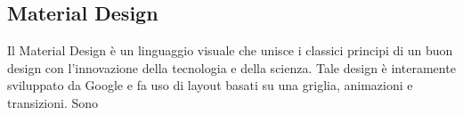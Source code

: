 	\subsection{Material Design}
	Il Material Design è un linguaggio visuale che unisce i classici principi di
	un buon design con l'innovazione della tecnologia e della scienza. 
	\cite{material} \newline
	Tale design è interamente sviluppato da Google e fa uso di layout basati su
	una griglia, animazioni e transizioni. Sono
	
